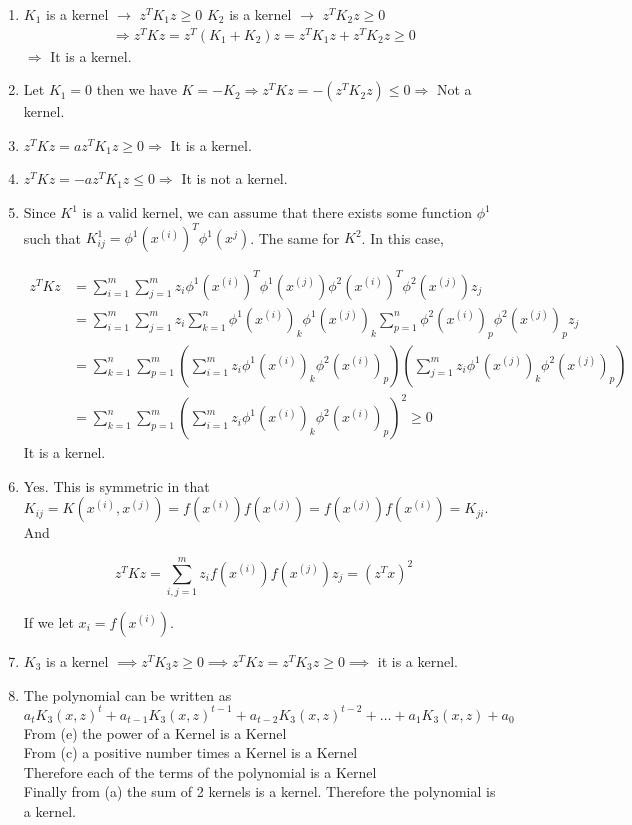 \begin{answer}
	\begin{enumerate}[label=(\alph*)]
		\item $K_{1}$ is a kernel $\rightarrow$ $z^{T}K_{1}z \geq 0$
		$K_{2}$ is a kernel $\rightarrow$ $z^{T}K_{2}z \geq 0$
		\begin{align*}
		\Rightarrow z^{T}Kz = z^{T}(K_{1}+K_{2})z = z^{T}K_{1}z+z^{T}K_{2}z \geq 0
		\end{align*}
		$\Rightarrow$ It is a kernel.
		
		\item Let $K_{1} = 0$ then we have $K=-K_{2} \Rightarrow z^{T}Kz = -(z^{T}K_{2}z) \leq 0 \Rightarrow$ Not a kernel.
		
		\item $z^{T}Kz = az^{T}K_{1}z \geq 0 \Rightarrow$ It is a kernel.
		
		\item $z^{T}Kz = -az^{T}K_{1}z \leq 0 \Rightarrow$ It is not a kernel.
		
		\item Since $K^1$ is a valid kernel, we can assume that there exists some function $\phi^1$ such that $K^1_{ij} = \phi^1(x^{(i)})^T \phi^1(x^{j})$. The same for $K^2$. In this case, 
		
		\begin{align}
		z^TK z &= \sum_{i=1}^m\sum_{j=1}^m z_i\phi^1(x^{(i)})^T\phi^1(x^{(j)})\phi^2(x^{(i)})^T\phi^2(x^{(j)})z_j\\
		&=\sum_{i=1}^m\sum_{j=1}^m z_i\sum_{k=1}^n\phi^1(x^{(i)})_k\phi^1(x^{(j)})_k\sum_{p=1}^n\phi^2(x^{(i)})_p\phi^2(x^{(j)})_pz_j\\
		&=\sum_{k=1}^n\sum_{p=1}^m (\sum_{i=1}^mz_i\phi^1(x^{(i)})_k\phi^2(x^{(i)})_p)(\sum_{j=1}^mz_i\phi^1(x^{(j)})_k\phi^2(x^{(j)})_p)\\
		&=\sum_{k=1}^n\sum_{p=1}^m (\sum_{i=1}^mz_i\phi^1(x^{(i)})_k\phi^2(x^{(i)})_p)^2 \ge 0
		\end{align}
		It is a kernel.
		
		\item Yes. This is symmetric in that $K_{ij} = K(x^{(i)}, x^{(j)}) = f(x^{(i)})f(x^{(j)}) = f(x^{(j)})f(x^{(i)}) = K_{ji}$. And
		
		$$
		z^TKz = \sum_{i,j=1}^m z_if(x^{(i)})f(x^{(j)}) z_j= (z^Tx)^2
		$$
		
		If we let $x_i = f(x^{(i)})$.
	\item $K_{3}$ is a kernel $\implies z^{T}K_{3}z \geq 0\implies z^{T}Kz = z^{T}K_{3}z \geq 0 \implies$ it is a kernel.  
	
	\item The polynomial can be written as $a_tK_3(x,z)^t+a_{t-1}K_3(x,z)^{t-1}+a_{t-2}K_3(x,z)^{t-2}+\dots+a_1K_3(x,z)+a_0$\\
	From (e) the power of a Kernel is a Kernel\\
	From (c) a positive number times a Kernel is a Kernel\\
	Therefore each of the terms of the polynomial is a Kernel\\
	Finally from (a) the sum of 2 kernels is a kernel. Therefore the polynomial is a kernel.
	\end{enumerate}
	
\end{answer}